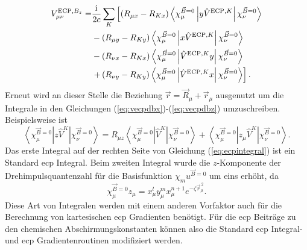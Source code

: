 	\begin{equation}\label{eq:vecpdbz}
	\begin{aligned}
	V_{\mu\nu}^{\textrm{ECP},B_z}=&\frac{\mathrm{i}\mkern1mu}{2c}\sum_K\left[\left(R_{\mu x}-R_{Kx}\right)\left\langle\chi_\mu^{\vec{B}=0}\left\vert y\hat{V}^{\textrm{ECP},K}\right\vert\chi_\nu^{\vec{B}=0}\right\rangle\right.\\
	&-\left(R_{\mu y}-R_{Ky}\right)\left\langle\chi_\mu^{\vec{B}=0}\left\vert x\hat{V}^{\textrm{ECP},K}\right\vert\chi_\nu^{\vec{B}=0}\right\rangle\\
	&-\left(R_{\nu x}-R_{Kx}\right)\left\langle\chi_\mu^{\vec{B}=0}\left\vert \hat{V}^{\textrm{ECP},K}y\right\vert\chi_\nu^{\vec{B}=0}\right\rangle\\
	&\left.+\left(R_{\nu y}-R_{Ky}\right)\left\langle\chi_\mu^{\vec{B}=0}\left\vert \hat{V}^{\textrm{ECP},K} x\right\vert\chi_\nu^{\vec{B}=0}\right\rangle\right].
	\end{aligned}
	\end{equation} 
	Erneut wird an dieser Stelle die Beziehung $\vec{r}=\vec{R}_\mu+\vec{r}_\mu$ ausgenutzt um die Integrale in den Gleichungen (\ref{eq:vecpdbx})-(\ref{eq:vecpdbz}) umzuschreiben. Beispielsweise ist 
	\begin{equation}\label{eq:ecpintegral}
	\left\langle\chi_\mu^{\vec{B}=0}\left\vert z\hat{V}^K\right\vert\chi_\nu^{\vec{B}=0}\right\rangle=R_{\mu z}\left\langle\chi_\mu^{\vec{B}=0}\left\vert \hat{V}^K\right\vert\chi_\nu^{\vec{B}=0}\right\rangle+\left\langle\chi_\mu^{\vec{B}=0}\left\vert z_\mu\hat{V}^K\right\vert\chi_\nu^{\vec{B}=0}\right\rangle.
	\end{equation}
	Das erste Integral auf der rechten Seite von Gleichung (\ref{eq:ecpintegral}) ist ein Standard \ac{ecp} Integral. Beim zweiten Integral wurde die $z$-Komponente der Drehimpulsquantenzahl für die Basisfunktion $\chi_mu^{\vec{B}=0}$ um eins erhöht, da
	\begin{equation}
	\chi_\mu^{\vec{B}=0}z_\mu=x_\mu^ly_\mu^mx_\mu^{n+1}e^{-\zeta\vec{r}^{\, 2}_\mu}.
	\end{equation}
	Diese Art von Integralen werden mit einem anderen Vorfaktor auch für die Berechnung von kartesischen \ac{ecp} Gradienten benötigt. Für die \ac{ecp} Beiträge zu den chemischen Abschirmungskonstanten können also die Standard \ac{ecp} Integral- und \ac{ecp} Gradientenroutinen modifiziert werden. 
	

